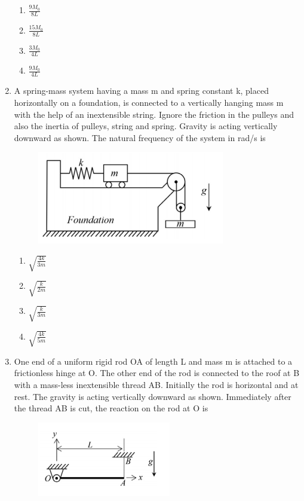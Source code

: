 \documentclass[a4paper,10pt]{article}
\begin{document}
\begin{enumerate}
\hfill{}
\begin{enumerate}
    \item $\frac{9M_0}{8L}$
    \item $\frac{15M_0}{8L}$
    \item $\frac{3M_0}{4L}$
    \item $\frac{9M_0}{4L}$
\end{enumerate}

\item A spring-mass system having a mass m and spring constant k, placed horizontally on a foundation, is connected to a vertically hanging mass m with the help of an inextensible string. Ignore the friction in the pulleys and also the inertia of pulleys, string and spring. Gravity is acting vertically downward as shown. The natural frequency of the system in rad/s is
\begin{figure}[H]
    \centering
    \includegraphics[width=0.6\columnwidth]{q76.png}
    \caption*{}
    \label{fig:q76}
\end{figure}

\hfill{}
\begin{enumerate}
    \item $\sqrt{\frac{4k}{3m}}$
    \item $\sqrt{\frac{k}{2m}}$
    \item $\sqrt{\frac{k}{3m}}$
    \item $\sqrt{\frac{4k}{5m}}$
\end{enumerate}

\item One end of a uniform rigid rod OA of length L and mass m is attached to a frictionless hinge at O. The other end of the rod is connected to the roof at B with a mass-less inextensible thread AB. Initially the rod is horizontal and at rest. The gravity is acting vertically downward as shown. Immediately after the thread AB is cut, the reaction on the rod at O is
\begin{figure}[H]
    \centering
    \includegraphics[width=0.5\columnwidth]{q77.png}
    \caption*{}
    \label{fig:q77}
\end{figure}


\end{enumerate}
\end{document}
